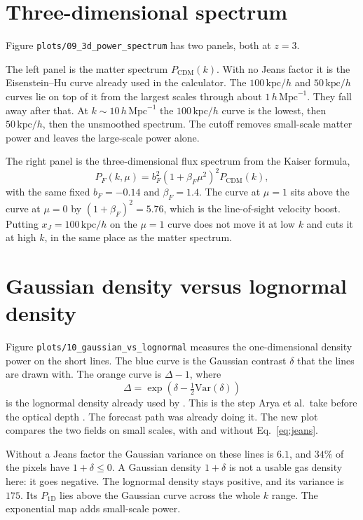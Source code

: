 \documentclass[11pt]{article}
\begin{document}
\section{Three-dimensional spectrum}

Figure \texttt{plots/09\_3d\_power\_spectrum} has two panels, both at $z=3$.

The left panel is the matter spectrum $P_\mathrm{CDM}(k)$. With no Jeans factor it is the Eisenstein--Hu curve already used in the calculator. The $100\,\mathrm{kpc}/h$ and $50\,\mathrm{kpc}/h$ curves lie on top of it from the largest scales through about $1\,h\,\mathrm{Mpc}^{-1}$. They fall away after that. At $k\sim 10\,h\,\mathrm{Mpc}^{-1}$ the $100\,\mathrm{kpc}/h$ curve is the lowest, then $50\,\mathrm{kpc}/h$, then the unsmoothed spectrum. The cutoff removes small-scale matter power and leaves the large-scale power alone.

The right panel is the three-dimensional flux spectrum from the Kaiser formula,
\begin{equation}
P_F(k,\mu)=b_F^{2}(1+\beta_F\mu^{2})^{2}P_\mathrm{CDM}(k),
\end{equation}
with the same fixed $b_F=-0.14$ and $\beta_F=1.4$. The curve at $\mu=1$ sits above the curve at $\mu=0$ by $(1+\beta_F)^{2}=5.76$, which is the line-of-sight velocity boost. Putting $x_J=100\,\mathrm{kpc}/h$ on the $\mu=1$ curve does not move it at low $k$ and cuts it at high $k$, in the same place as the matter spectrum.

\section{Gaussian density versus lognormal density}

Figure \texttt{plots/10\_gaussian\_vs\_lognormal} measures the one-dimensional density power on the short lines. The blue curve is the Gaussian contrast $\delta$ that the lines are drawn with. The orange curve is $\Delta-1$, where
\begin{equation}
\Delta=\exp\!\left(\delta-\tfrac12\mathrm{Var}(\delta)\right)
\end{equation}
is the lognormal density already used by . This is the step Arya et al.\ take before the optical depth \cite{Arya:2022uke}. The forecast path was already doing it. The new plot compares the two fields on small scales, with and without Eq.~\eqref{eq:jeans}.

Without a Jeans factor the Gaussian variance on these lines is $6.1$, and $34\%$ of the pixels have $1+\delta\le 0$. A Gaussian density $1+\delta$ is not a usable gas density here: it goes negative. The lognormal density stays positive, and its variance is $175$. Its $P_{1\mathrm{D}}$ lies above the Gaussian curve across the whole $k$ range. The exponential map adds small-scale power.
\end{document}
